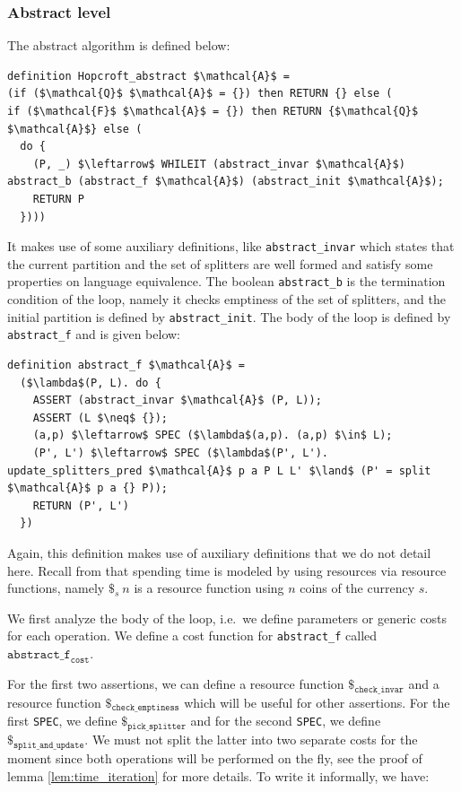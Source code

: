 \documentclass[12pt, a4 paper]{article}
\theoremstyle{definition}
\begin{document}
\subsubsection{Abstract level}
The abstract algorithm is defined below:
\begin{lstlisting}[language=Isabelle]
definition Hopcroft_abstract $\mathcal{A}$ = 
(if ($\mathcal{Q}$ $\mathcal{A}$ = {}) then RETURN {} else (
if ($\mathcal{F}$ $\mathcal{A}$ = {}) then RETURN {$\mathcal{Q}$ $\mathcal{A}$} else (
  do {
    (P, _) $\leftarrow$ WHILEIT (abstract_invar $\mathcal{A}$) abstract_b (abstract_f $\mathcal{A}$) (abstract_init $\mathcal{A}$);
    RETURN P
  })))
\end{lstlisting}
It makes use of some auxiliary definitions, like \texttt{abstract\_invar} which states that the current partition and the set of splitters are well formed and satisfy some properties on language equivalence. The boolean \texttt{abstract\_b} is the termination condition of the loop, namely it checks emptiness of the set of splitters, and the initial partition is defined by \texttt{abstract\_init}. The body of the loop is defined by \texttt{abstract\_f} and is given below:
\begin{lstlisting}[language=Isabelle]
definition abstract_f $\mathcal{A}$ = 
  ($\lambda$(P, L). do {
    ASSERT (abstract_invar $\mathcal{A}$ (P, L));
    ASSERT (L $\neq$ {});
    (a,p) $\leftarrow$ SPEC ($\lambda$(a,p). (a,p) $\in$ L);
    (P', L') $\leftarrow$ SPEC ($\lambda$(P', L'). update_splitters_pred $\mathcal{A}$ p a P L L' $\land$ (P' = split $\mathcal{A}$ p a {} P));
    RETURN (P', L')
  })
\end{lstlisting}
Again, this definition makes use of auxiliary definitions that we do not detail here. Recall from \cite{fewdollarsmore} that spending time is modeled by using resources via resource functions, namely $\$_{s}\ n$ is a resource function using $n$ coins of the currency $s$.

We first analyze the body of the loop, i.e.\ we define parameters or generic costs for each operation.
We define a cost function for \texttt{abstract\_f} called $\texttt{abstract\_f}_{\texttt{cost}}$.

For the first two assertions, we can define a resource function $\$_{\texttt{check\_invar}}$ and a resource function $\$_{\texttt{check\_emptiness}}$ which will be useful for other assertions.
For the first \texttt{SPEC}, we define $\$_{\texttt{pick\_splitter}}$ and for the second \texttt{SPEC}, we define $\$_{\texttt{split\_and\_update}}$. We must not split the latter into two separate costs for the moment since both operations will be performed on the fly, see the proof of lemma \ref{lem:time_iteration} for more details.
To write it informally, we have:
\end{document}
